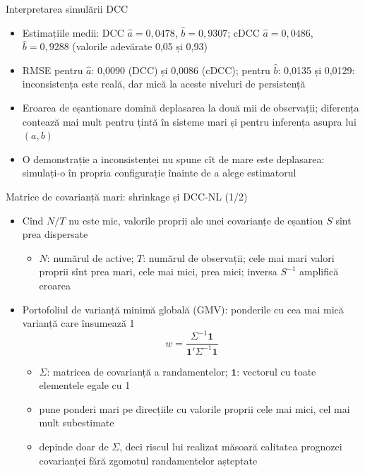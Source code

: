 \begin{frame}{Interpretarea simulării DCC}
\itemsize{\small}
\begin{itemize}
    \item Estimațiile medii: DCC $\hat a = 0{,}0478$, $\hat b = 0{,}9307$; cDCC $\hat a = 0{,}0486$, $\hat b = 0{,}9288$ (valorile adevărate 0,05 și 0,93)
    \item RMSE pentru $\hat a$: 0{,}0090 (DCC) și 0{,}0086 (cDCC); pentru $\hat b$: 0{,}0135 și 0{,}0129: inconsistența este reală, dar mică la aceste niveluri de persistență
    \item Eroarea de eșantionare domină deplasarea la două mii de observații; diferența contează mai mult pentru țintă în sisteme mari și pentru inferența asupra lui $(a, b)$
    \item O demonstrație a inconsistenței nu spune cît de mare este deplasarea: simulați-o în propria configurație înainte de a alege estimatorul
\end{itemize}
\end{frame}

\begin{frame}{Matrice de covarianță mari: shrinkage și DCC-NL (1/2)}
\itemsize{\small}
\begin{itemize}
    \item Cînd $N/T$ nu este mic, valorile proprii ale unei covarianțe de eșantion $S$ sînt prea dispersate
    \begin{itemize}
        \item $N$: numărul de active; $T$: numărul de observații; cele mai mari valori proprii sînt prea mari, cele mai mici, prea mici; inversa $S^{-1}$ amplifică eroarea
    \end{itemize}
    \item Portofoliul de varianță minimă globală (GMV): ponderile cu cea mai mică varianță care însumează 1
    \[ w = \frac{\Sigma^{-1}\mathbf 1}{\mathbf 1'\Sigma^{-1}\mathbf 1} \]
    \begin{itemize}
        \item $\Sigma$: matricea de covarianță a randamentelor; $\mathbf 1$: vectorul cu toate elementele egale cu 1
        \item pune ponderi mari pe direcțiile cu valorile proprii cele mai mici, cel mai mult subestimate
        \item depinde doar de $\Sigma$, deci riscul lui realizat măsoară calitatea prognozei covarianței fără zgomotul randamentelor așteptate
    \end{itemize}
\end{itemize}
\end{frame}

